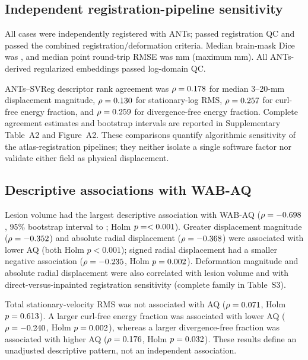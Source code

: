 \documentclass[11pt]{article}
\begin{document}
\subsection{Independent registration-pipeline sensitivity}

All \AntsManifestN{} cases were independently registered with ANTs;
\AntsRegistrationPassN{} passed registration QC and
\AntsDeformationPassN{} passed the combined registration/deformation criteria.
Median brain-mask Dice was \AntsBrainDiceMedian{}, and median point round-trip
RMSE was \AntsCycleMedian{} mm (maximum \AntsCycleMaximum{} mm). All
\AntsHodgePassN{} ANTs-derived regularized embeddings passed log-domain QC.

ANTs--SVReg descriptor rank agreement was
$\rho=0.178$ for median 3--20-mm displacement magnitude,
$\rho=0.130$ for stationary-log RMS,
$\rho=0.257$ for curl-free energy fraction, and
$\rho=0.259$ for divergence-free energy fraction.
Complete agreement estimates and bootstrap intervals are reported in
Supplementary Table~A2 and Figure~A2. These comparisons quantify algorithmic
sensitivity of the atlas-registration pipelines; they neither isolate a single
software factor nor validate either field as physical displacement.

\subsection{Descriptive associations with WAB-AQ}

Lesion volume had the largest descriptive association with WAB-AQ
($\rho=-0.698$, 95\% bootstrap interval
\LesionVolumeAQCILow{} to \LesionVolumeAQCIHigh{}; Holm
$p=<0.001$). Greater displacement magnitude
($\rho=-0.352$) and absolute radial displacement
($\rho=-0.368$) were associated with lower AQ (both Holm
$p<0.001$); signed radial displacement had a smaller negative association
($\rho=-0.235$, Holm $p=0.002$). Deformation
magnitude and absolute radial displacement were also correlated with lesion
volume and with direct-versus-inpainted registration sensitivity (complete
family in Table~S3).

Total stationary-velocity RMS was not associated with AQ
($\rho=0.071$, Holm $p=0.613$). A larger curl-free energy
fraction was associated with lower AQ ($\rho=-0.240$, Holm
$p=0.002$), whereas a larger divergence-free fraction was associated
with higher AQ ($\rho=0.176$, Holm
$p=0.032$). These results define an unadjusted descriptive
pattern, not an independent association.
\end{document}
